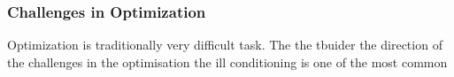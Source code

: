 \subsubsection{Challenges in Optimization}

Optimization is traditionally very difficult task. The the tbuider the direction of the challenges in the optimisation 
the ill conditioning is one of the most common 